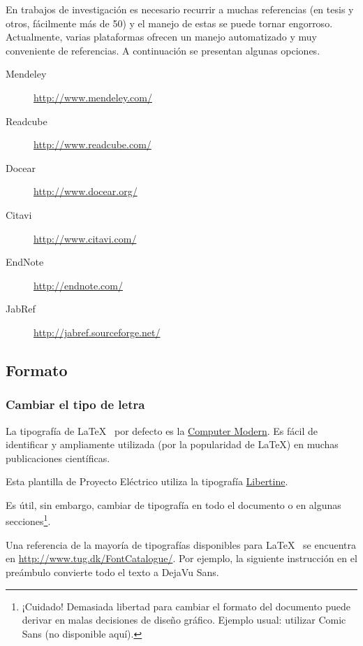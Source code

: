 En trabajos de investigación es necesario recurrir a muchas referencias (en tesis y otros, fácilmente más de 50) y el manejo de estas se puede tornar engorroso. Actualmente, varias plataformas ofrecen un manejo automatizado y muy conveniente de referencias. A continuación se presentan algunas opciones.

\begin{multicols}{2}
\begin{description}
\item[Mendeley] \url{http://www.mendeley.com/}
\item[Readcube] \url{http://www.readcube.com/}
\item[Docear] \url{http://www.docear.org/}
\item[Citavi] \url{http://www.citavi.com/}
\item[EndNote] \url{http://endnote.com/}
\item[JabRef] \url{http://jabref.sourceforge.net/}
\end{description}
\end{multicols}

\subsection{Formato}

\subsubsection{Cambiar el tipo de letra}

La tipografía de \LaTeX~ por defecto es la \href{https://en.wikipedia.org/wiki/Computer_Modern}{Computer Modern}. Es fácil de identificar y ampliamente utilizada (por la popularidad de \LaTeX) en muchas publicaciones científicas.

Esta plantilla de Proyecto Eléctrico utiliza la tipografía \href{http://www.linuxlibertine.org/}{Libertine}. 

Es útil, sin embargo, cambiar de tipografía en todo el documento o en algunas secciones\footnote{¡Cuidado! Demasiada libertad para cambiar el formato del documento puede derivar en malas decisiones de diseño gráfico. Ejemplo usual: utilizar Comic Sans (no disponible aquí).}.

Una referencia de la mayoría de tipografías disponibles para \LaTeX~ se encuentra en \url{http://www.tug.dk/FontCatalogue/}. Por ejemplo, la siguiente instrucción en el preámbulo convierte todo el texto a DejaVu Sans.

